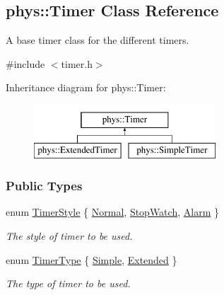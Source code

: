 \hypertarget{classphys_1_1Timer}{
\subsection{phys::Timer Class Reference}
\label{d3/d83/classphys_1_1Timer}
}


A base timer class for the different timers.  




{\ttfamily \#include $<$timer.h$>$}

Inheritance diagram for phys::Timer:\begin{figure}[H]
\begin{center}
\leavevmode
\includegraphics[height=2.000000cm]{d3/d83/classphys_1_1Timer}
\end{center}
\end{figure}
\subsubsection*{Public Types}
\begin{DoxyCompactItemize}
\item 
enum \hyperlink{classphys_1_1Timer_a1ee86bf43e20329d750c5d582dcce329}{TimerStyle} \{ \hyperlink{classphys_1_1Timer_a1ee86bf43e20329d750c5d582dcce329a5debd5b8437d14405bf25cd9b130449f}{Normal}, 
\hyperlink{classphys_1_1Timer_a1ee86bf43e20329d750c5d582dcce329a7599daa63100c2134df7d8b7c9b7f867}{StopWatch}, 
\hyperlink{classphys_1_1Timer_a1ee86bf43e20329d750c5d582dcce329ae9b9fa35767e4ac2c87c078e1d9a0729}{Alarm}
 \}
\begin{DoxyCompactList}\small\item\em The style of timer to be used. \item\end{DoxyCompactList}\item 
enum \hyperlink{classphys_1_1Timer_aacbbca9cc5543fc8414de59cd085c1c1}{TimerType} \{ \hyperlink{classphys_1_1Timer_aacbbca9cc5543fc8414de59cd085c1c1af8d1697e79f90f675fecc82e9aba7819}{Simple}, 
\hyperlink{classphys_1_1Timer_aacbbca9cc5543fc8414de59cd085c1c1aba207ea661f064c2041c73852c91efaa}{Extended}
 \}
\begin{DoxyCompactList}\small\item\em The type of timer to be used. \item\end{DoxyCompactList}\end{DoxyCompactItemize}
